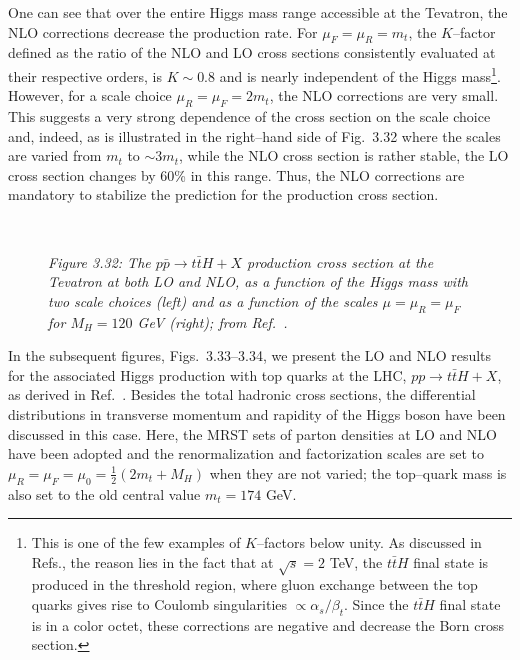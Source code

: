 One can see that over the entire Higgs mass range accessible at the Tevatron,
the NLO corrections decrease the production rate.  For $\mu_F=\mu_R=m_t$, the
$K$--factor defined as the ratio of the NLO and LO cross sections consistently
evaluated at their respective orders, is $K \sim 0.8$ and is nearly independent
of the Higgs mass\footnote{This is one of the few examples of $K$--factors
below unity. As discussed in Refs.\cite{Htt-NLO-DESY,Htt-NLO-Tev}, the reason 
lies in the fact
that at $\sqrt{s}=2$ TeV, the $t\bar tH$ final state is produced in the
threshold region, where gluon exchange between the top quarks gives rise to
Coulomb singularities $\propto \alpha_s /\beta_t$. Since the $t\bar tH$ final
state is in a color octet, these corrections are negative and decrease the Born
cross section.}.  However, for a scale choice $\mu_R=\mu_F=2m_t$, the NLO
corrections are very small.  This suggests a very strong dependence of the
cross section on the scale choice and, indeed, as is illustrated in the
right--hand side of Fig.~3.32 where the scales are varied from $m_t$ to $\sim
3m_t$, while the NLO cross section is rather stable, the LO cross section
changes by 60\% in this range. Thus, the NLO corrections are 
mandatory to stabilize the prediction for the production cross section.  

\begin{figure}[!h]
\begin{center}
\hspace*{-.7cm}
\mbox{
  \hspace*{2mm} 
  }
\end{center}
\vspace*{-.5cm}
{\it Figure 3.32: The $p\bar p \to t \bar tH+X$ production cross section at the 
Tevatron at both LO and NLO, as a function of the Higgs mass with two scale 
choices (left) and as a function of the scales $\mu= \mu_R=\mu_F$ for 
$M_H=120$ GeV (right); from Ref.~\cite{Htt-NLO-Tev}.}
\vspace*{-.4cm}
\end{figure}

In the subsequent figures, Figs.~3.33--3.34, we present the LO and NLO results
for the associated Higgs production with top quarks at the LHC, $pp\to t\bar t
H+X$, as derived in Ref.~\cite{Htt-NLO-DESY}. Besides the total hadronic cross
sections, the differential distributions in transverse momentum and rapidity of
the Higgs boson have been discussed in this case. Here, the MRST sets of parton
densities at LO and NLO have been adopted and the renormalization and
factorization scales are set to $\mu_R=\mu_F= \mu_0= \frac{1}{2} (2m_t+M_H)$
when they are not varied; the top--quark mass is also set to the old central
value $m_t=174$ GeV.  

